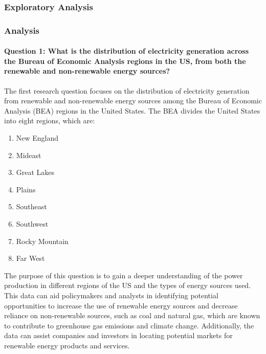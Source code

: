 \documentclass[
]{article}
\providecommand{\tightlist}{%
  \setlength{\itemsep}{0pt}\setlength{\parskip}{0pt}}
\begin{document}
\newpage

\hypertarget{exploratory-analysis}{%
\subsubsection{Exploratory Analysis}\label{exploratory-analysis}}

\newpage

\hypertarget{analysis}{%
\subsubsection{Analysis}\label{analysis}}

\hypertarget{question-1-what-is-the-distribution-of-electricity-generation-across-the-bureau-of-economic-analysis-regions-in-the-us-from-both-the-renewable-and-non-renewable-energy-sources}{%
\paragraph{Question 1: What is the distribution of electricity
generation across the Bureau of Economic Analysis regions in the US,
from both the renewable and non-renewable energy
sources?}\label{question-1-what-is-the-distribution-of-electricity-generation-across-the-bureau-of-economic-analysis-regions-in-the-us-from-both-the-renewable-and-non-renewable-energy-sources}}

The first research question focuses on the distribution of electricity
generation from renewable and non-renewable energy sources among the
Bureau of Economic Analysis (BEA) regions in the United States. The BEA
divides the United States into eight regions, which are:

\begin{enumerate}
\def\labelenumi{\arabic{enumi}.}
\tightlist
\item
  New England
\item
  Mideast
\item
  Great Lakes
\item
  Plains
\item
  Southeast
\item
  Southwest
\item
  Rocky Mountain
\item
  Far West
\end{enumerate}

The purpose of this question is to gain a deeper understanding of the
power production in different regions of the US and the types of energy
sources used. This data can aid policymakers and analysts in identifying
potential opportunities to increase the use of renewable energy sources
and decrease reliance on non-renewable sources, such as coal and natural
gas, which are known to contribute to greenhouse gas emissions and
climate change. Additionally, the data can assist companies and
investors in locating potential markets for renewable energy products
and services.
\end{document}
